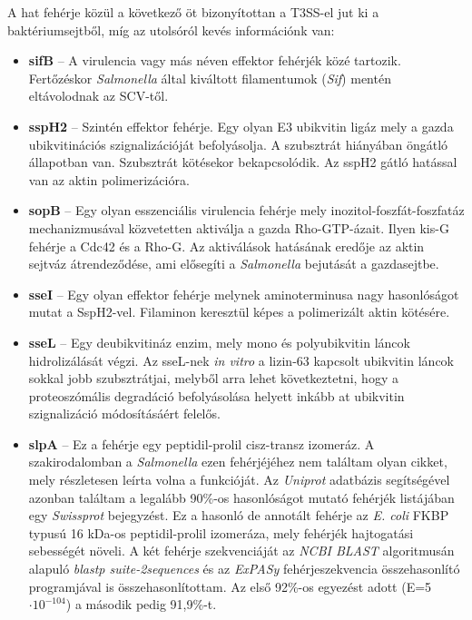 \documentclass[a4paper,12pt]{article}
\begin{document}
				
		\noindent A hat fehérje közül a következő öt bizonyítottan a T3SS-el jut ki a baktériumsejtből, míg az utolsóról kevés információnk van: 
		
		\begin{itemize}
			\item \textbf{sifB} -- A virulencia vagy más néven effektor fehérjék közé tartozik. Fertőzéskor \textit{Salmonella} által kiváltott filamentumok (\textit{Sif}) mentén eltávolodnak az SCV-től. \cite{sifB}
			\textit{}
			\item \textbf{sspH2} -- Szintén effektor fehérje. Egy olyan E3 ubikvitin ligáz mely a gazda ubikvitinációs szignalizációját befolyásolja. A szubsztrát hiányában öngátló állapotban van. Szubsztrát kötésekor bekapcsolódik. \cite{ssph2} Az sspH2 gátló hatással van az aktin polimerizációra. \cite{salmonella_and_host_cell_nature}
			
			\item \textbf{sopB} -- Egy olyan esszenciális virulencia fehérje mely inozitol-foszfát-foszfatáz mechanizmusával közvetetten aktiválja a gazda Rho-GTP-ázait. Ilyen kis-G fehérje a Cdc42 és a Rho-G. Az aktiválások hatásának eredője az aktin sejtváz átrendeződése, ami elősegíti a \textit{Salmonella} bejutását a gazdasejtbe. \cite{salmonella_and_host_cell_nature}
			
			\item \textbf{sseI} -- Egy olyan effektor fehérje melynek aminoterminusa nagy hasonlóságot mutat a SspH2-vel. Filaminon keresztül képes a polimerizált aktin kötésére. \cite{salmonella_and_host_cell_nature}
			
			\item \textbf{sseL} -- Egy deubikvitináz enzim, mely  mono és polyubikvitin láncok hidrolizálását végzi. Az sseL-nek \textit{in vitro} a lizin-63 kapcsolt ubikvitin láncok sokkal jobb szubsztrátjai, melyből arra lehet következtetni, hogy a proteoszómális degradáció befolyásolása helyett inkább at ubikvitin szignalizáció módosításáért felelős. \cite{sseL}
			
			\item \textbf{slpA} -- Ez a fehérje egy peptidil-prolil cisz-transz izomeráz. A szakirodalomban a \textit{Salmonella} ezen fehérjéjéhez nem találtam olyan cikket, mely részletesen leírta volna a funkcióját. Az \textit{Uniprot} adatbázis segítségével azonban találtam a legalább 90\%-os hasonlóságot mutató fehérjék listájában egy \textit{Swissprot} bejegyzést. Ez a hasonló de annotált fehérje az \textit{E. coli} FKBP typusú 16 kDa-os peptidil-prolil izomeráza, mely fehérjék hajtogatási sebességét növeli. \cite{fkbp} A két fehérje szekvenciáját az \textit{NCBI BLAST} algoritmusán alapuló \textit{blastp suite-2sequences} és az \textit{ExPASy} fehérjeszekvencia összehasonlító programjával is összehasonlítottam. Az első 92\%-os egyezést adott (E=5$\cdot 10^{-104}$) a második pedig 91,9\%-t.
			
		\end{itemize}
		
\end{document}
